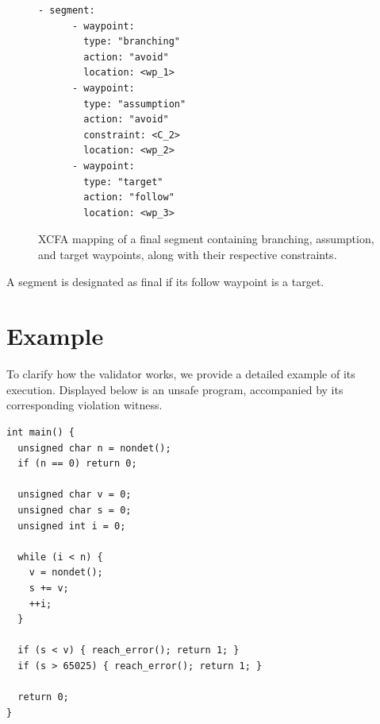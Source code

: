 \begin{figure}[H]
  \centering
  \begin{minipage}[t]{0.35\textwidth}
    \begin{lstlisting}[style=c, columns=flexibl]
    - segment:
      - waypoint:
        type: "branching"
        action: "avoid"
        location: <wp_1>
      - waypoint:
        type: "assumption"
        action: "avoid"
        constraint: <C_2>
        location: <wp_2>
      - waypoint:
        type: "target"
        action: "follow"
        location: <wp_3>
    \end{lstlisting}
    \end{minipage}
  \caption{XCFA mapping of a final segment containing branching, assumption, and target waypoints, along with their respective constraints.}
  \label{fig:combined}
\end{figure}

A segment is designated as final if its follow waypoint is a target.

\section{Example}
To clarify how the validator works, we provide a detailed example of its execution.
Displayed below is an unsafe program, accompanied by its corresponding violation witness.

\begin{lstlisting}[style=c,caption=C Program,label=lst:code]
int main() {
  unsigned char n = nondet();
  if (n == 0) return 0;
  
  unsigned char v = 0;
  unsigned char s = 0;
  unsigned int i = 0;
  
  while (i < n) {
    v = nondet();
    s += v;
    ++i;
  }
  
  if (s < v) { reach_error(); return 1; }
  if (s > 65025) { reach_error(); return 1; }
  
  return 0;
}
\end{lstlisting}

